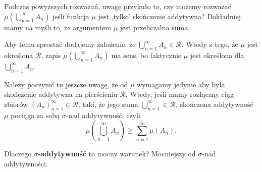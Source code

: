 \begin{remark}
	Podczas powyższych rozważań, uwagę przykuło to, czy możemy rozważać $\mu\left( \bigcup_{n=1} ^{\infty} A_{n}\right) $ jeśli funkcja $\mu$ jest ,tylko' skończenie addytywna? Dokładniej mamy na myśli to, że argumentem $\mu$ jest przeliczalna suma.

Aby temu sprostać dodajemy założenie, że $\bigcup_{n=1} ^{\infty}A_{n} \in \mathcal{R}$. Wtedy z tego, że $\mu$ jest określona $\mathcal{R}$, zapis $\mu\left( \bigcup_{n=1}^{\infty}A_{n} \right) $ ma sens, bo faktycznie $\mu$ jest określona dla $\bigcup_{n=1} ^{\infty}A_{n}$.
	
Należy poczynić tu jeszcze uwagę, że od  $\mu$ wymagamy jedynie aby była skończenie addytywna na pierścieniu $\mathcal{R}$. Wtedy, jeśli mamy rozłączny ciąg zbiorów $\left( A_{n} \right)_{n=1}^{\infty} \in \mathcal{R}$, taki, że jego suma $\bigcup_{n=1}^{\infty}\in \mathcal{R}$, skończona addytywność $\mu$ pociąga za sobą $\sigma$-nad addytywność, czyli
 \[
\mu\left( \bigcup_{n=1}^{\infty}A_{n} \right) \ge \sum_{n = 1}^{\infty} \mu\left( A_{n} \right) 
.\] 
\end{remark} 
\begin{question}
	Dlaczego \textbf{$\sigma$-addytywność} to mocny warunek? Mocniejszy od $\sigma$-nad addytywności.
\end{question}

